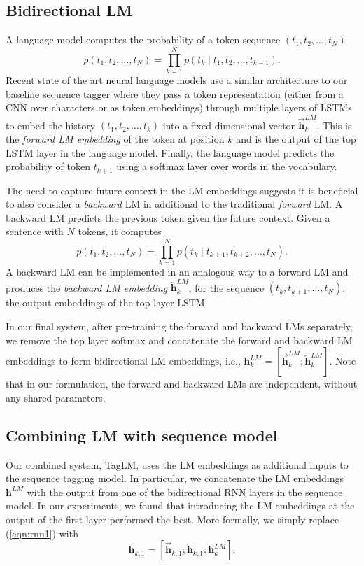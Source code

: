 \documentclass[11pt,a4paper]{article}
\begin{document}
\subsection{Bidirectional LM}
\label{sec:bidirectional_lm}
A language model computes the probability of a token sequence $(t_1, t_2, \ldots, t_N)$
\[
p(t_1, t_2, \ldots, t_N) = \prod_{k=1}^N p({t_k} \mid t_1, t_2, \ldots, t_{k-1}).
\]
Recent state of the art neural language models \citep{Jzefowicz2016ExploringTL}
use a similar architecture to our baseline sequence tagger 
where they pass a token representation (either
from a CNN over characters or as token embeddings) through multiple layers of LSTMs to embed
the history $(t_1, t_2, \ldots, t_k)$ into a fixed dimensional vector $\overrightarrow{\mathbf{h}}^{LM}_k$. This is the \textit{forward LM embedding} of the token at position $k$ and is the output of the top LSTM layer in the language model. 
Finally, the language model predicts the probability of token $t_{k+1}$ using
a softmax layer over words in the vocabulary.

The need to capture future context in the LM embeddings suggests it
is beneficial to also consider a \textit{backward} LM in additional
to the traditional \textit{forward} LM.  A backward LM predicts the previous token given the future context.  Given a sentence with $N$ tokens, it computes
\[
p(t_1, t_2, \ldots, t_N) = \prod_{k=1}^N p(t_k \mid t_{k+1}, t_{k+2}, \ldots, t_N).
\]
A backward LM can be implemented in an analogous way to a forward LM and produces the \textit{backward LM embedding} $\overleftarrow{\mathbf{h}}^{LM}_k$, for the sequence $(t_k, t_{k+1}, \ldots, t_N)$, the output embeddings of the top layer LSTM.


In our final system, after pre-training the forward and backward LMs separately, we remove the top layer
softmax and concatenate the forward and backward LM embeddings to form bidirectional LM embeddings, i.e., 
$\mathbf{h}^{LM}_k = [\overrightarrow{\mathbf{h}}^{LM}_k; \overleftarrow{\mathbf{h}}^{LM}_k]$.
Note that in our formulation, the forward and backward LMs are independent, without
any shared parameters.


\subsection{Combining LM with sequence model}
\label{sec:combining}

Our combined system, TagLM, uses the LM embeddings as additional inputs to the sequence tagging model.
In particular, we concatenate the LM embeddings $\mathbf{h}^{LM}$ with the output from one of the bidirectional RNN
layers in the sequence model.
In our experiments, we found that introducing the LM embeddings
at the output of the first layer performed the best.  More formally, we simply replace (\ref{eqn:rnn1}) with
\begin{equation}
\mathbf{h}_{k,1} = [\overrightarrow{\mathbf{h}}_{k,1}; \overleftarrow{\mathbf{h}}_{k,1}; \mathbf{h}_k^{LM}].  \label{eqn:lm_rnn1}
\end{equation}
\end{document}

